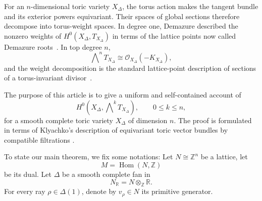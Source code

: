 \documentclass[colorlinks,11pt,reqno]{amsart}
\theoremstyle{definition}
\theoremstyle{remark}
\numberwithin{equation}{section}
\numberwithin{equation}{section}
\newcommand{\RR}{\mathbb{R}}
\newcommand{\R}{\mathbb{R}}
\newcommand{\Z}{\mathbb{Z}}
\DeclareMathOperator{\Hom}{Hom}
\begin{document}
For an $n$-dimensional toric variety $X_\Delta$, the torus action makes the tangent bundle and its exterior powers equivariant. Their spaces of global sections therefore decompose into torus-weight spaces.
In degree one, Demazure described the nonzero weights of \(H^0(X_\Delta, T_{X_\Delta})\) in terms
of the lattice points now called Demazure roots~\cite{Demazure}.
In top degree $n$,
\[
\bigwedge\nolimits^n T_{X_\Delta} \cong \mathcal{O}_{X_{\Delta}}(-K_{X_{\Delta}}),
\]
and the weight decomposition is the standard lattice-point description of sections of a torus-invariant divisor~\cites{Cox, Fulton}.


The purpose of this article is to give a uniform and self-contained account of
\[
H^0\!\left(X_\Delta,\bigwedge\nolimits^kT_{X_\Delta} \right), \qquad 0\leq k\leq n,
\]
for a smooth complete toric variety \(X_\Delta\) of dimension $n$.
The proof is formulated in terms of Klyachko's description of equivariant toric vector bundles by compatible filtrations \cite{Klyachko}.

To state our main theorem, we fix some notations:
Let \(N \cong \Z^n\) be a lattice, let
\[
M=\Hom(N, \Z)
\]
be its dual.
Let \(\Delta\) be a smooth complete fan in
\[
N_{\R}=N \otimes_{\Z} \RR.
\]
For every ray \(\rho \in \Delta(1)\), denote by \(v_\rho\in N\) its primitive generator.
\end{document}
